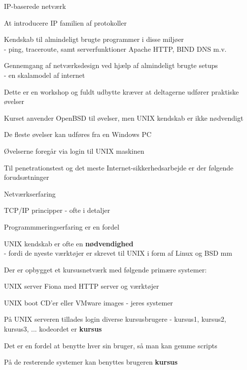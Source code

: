 \documentclass[20pt,landscape,a4paper,footrule]{foils}
\begin{document}
\centerline{IP-baserede netværk}


\begin{list1}
\item At introducere IP familien af protokoller
\item Kendskab til almindeligt brugte programmer i disse miljøer\\
 - ping, traceroute, samt serverfunktioner Apache HTTP, BIND DNS m.v.
\item Gennemgang af netværksdesign ved hjælp af almindeligt brugte setups\\ - en skalamodel af internet
\end{list1}


\begin{list1}
\item Dette er en workshop og fuldt udbytte kræver at
  deltagerne udfører praktiske øvelser
\item Kurset anvender OpenBSD til øvelser, men UNIX kendskab
er ikke nødvendigt
\item De fleste øvelser kan udføres fra en Windows PC
\item Øvelserne foregår via login til UNIX maskinen
\begin{list2}
\item Til penetrationstest og det meste Internet-sikkerhedsarbejde er der
følgende forudsætninger
\item Netværkserfaring
\item TCP/IP principper - ofte i detaljer
\item Programmmeringserfaring er en fordel
\item UNIX kendskab er ofte en {\bfseries nødvendighed}\\
- fordi de nyeste værktøjer er skrevet til UNIX i form af Linux og BSD
 mm
\end{list2}
\end{list1}



\begin{list1}
\item Der er opbygget et kursusnetværk med følgende primære systemer:
\begin{list2}
\item UNIX server Fiona med HTTP server og værktøjer
\item UNIX boot CD'er eller VMware images - jeres systemer
\end{list2}
\item På UNIX serveren tillades login diverse kursusbrugere - kursus1,
  kursus2, kursus3, ... kodeordet er {\bf kursus}
\item Det er en fordel at benytte hver sin bruger, så man kan gemme scripts
\item På de resterende systemer kan benyttes brugeren {\bf kursus}
\end{list1}
\end{document}
